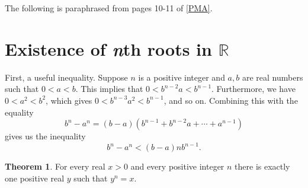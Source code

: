\documentclass[12pt]{article}
\theoremstyle{definition}
\newtheorem{theorem}{Theorem}
\begin{document}
The following is paraphrased from pages 10-11 of \hyperlink{pma}{[PMA]}.

\section{Existence of \textit{n}th roots in \texorpdfstring{\(\mathbb{R}\)}{}}

First, a useful inequality. Suppose \( n \) is a positive integer and \( a, b \) are real numbers such that \( 0 < a < b \). This implies that \( 0 < b^{n-2}a < b^{n-1} \). Furthermore, we have \( 0 < a^2 < b^2 \), which gives \( 0 < b^{n-3}a^2 < b^{n-1} \), and so on. Combining this with the equality
\[
b^n - a^n = (b - a)(b^{n-1} + b^{n-2}a + \cdots + a^{n-1})
\]
gives us the inequality
\[
b^n - a^n < (b - a)nb^{n-1}. \tag{1}
\]

\begin{theorem}

For every real \( x > 0 \) and every positive integer \( n \) there is exactly one positive real \( y \) such that \( y^n = x \).

\end{theorem}
\end{document}
